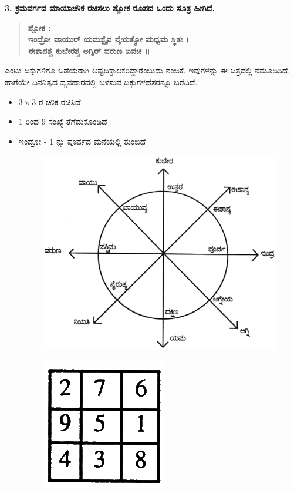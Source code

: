 \textbf{3. ಕ್ರಮವರ್ಗದ ಮಾಯಾಚೌಕ ರಚಿಸಲು ಶ್ಲೋಕ ರೂಪದ ಒಂದು ಸೂತ್ರ ಹೀಗಿದೆ.}
\begin{quote}
\textbf{ಶ್ಲೋಕ :}\\
\textbf{ಇಂದ್ರೋ ವಾಯುರ್ ಯಮಶ್ಬೈವ ನೈಋತ್ಯೋ ಮಧ್ಯಮ ಸ್ಥಿತಃ ।}\\
\textbf{ಈಶಾನಶ್ಚ ಕುಬೇರಶ್ಚ ಅಗ್ನಿರ್ ವರುಣ ಏವಚ ॥}
\end{quote}
ಎಂಟು ದಿಕ್ಕುಗಳಿಗೂ ಒಡೆಯರಾಗಿ ಅಷ್ಟದಿಕ್ಪಾಲಕರಿದ್ದಾರೆಂಬುದು ನಂಬಿಕೆ. ಇವುಗಳನ್ನು ಈ ಚಿತ್ರದಲ್ಲಿ ನಮೂದಿಸಿದೆ. ಹಾಗೆಯೇ ದಿನನಿತ್ಯದ ವ್ಯವಹಾರದಲ್ಲಿ ಬಳಸುವ ದಿಕ್ಕುಗಳ\break ಹೆಸರನ್ನೂ ಬರೆದಿದೆ.
\begin{itemize}
	\item $3 \times 3$ ರ ಚೌಕ ರಚಿಸಿದೆ
	\item 1 ರಿಂದ 9 ಸಂಖ್ಯೆ ತೆಗೆದುಕೊಂಡಿದೆ
	\item ಇಂದ್ರೋ - 1 ನ್ನು ಪೂರ್ವದ ಮನೆಯಲ್ಲಿ ತುಂಬಿದೆ
	\begin{figure}[H]
	\includegraphics[scale=.8]{src/figures/chap3/fig3.38.jpg}
	\end{figure}
	\begin{figure}[H]
	\includegraphics[scale=.8]{src/figures/chap3/fig3.39.jpg}

\end{figure}
\end{itemize}
